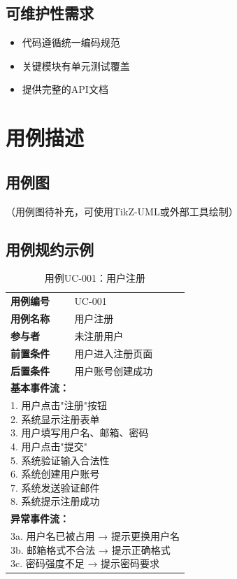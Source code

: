 \documentclass[12pt,a4paper]{ctexart}
\begin{document}
\subsection{可维护性需求}
\begin{itemize}
    \item 代码遵循统一编码规范
    \item 关键模块有单元测试覆盖
    \item 提供完整的API文档
\end{itemize}

\section{用例描述}
\subsection{用例图}
（用例图待补充，可使用TikZ-UML或外部工具绘制）

\subsection{用例规约示例}
\begin{table}[H]
\centering
\caption{用例UC-001：用户注册}
\begin{tabular}{lp{11cm}}
\toprule
\textbf{用例编号} & UC-001 \\
\textbf{用例名称} & 用户注册 \\
\textbf{参与者}   & 未注册用户 \\
\textbf{前置条件} & 用户进入注册页面 \\
\textbf{后置条件} & 用户账号创建成功 \\
\midrule
\multicolumn{2}{l}{\textbf{基本事件流：}} \\
\multicolumn{2}{l}{\parbox{11cm}{
1. 用户点击"注册"按钮 \\
2. 系统显示注册表单 \\
3. 用户填写用户名、邮箱、密码 \\
4. 用户点击"提交" \\
5. 系统验证输入合法性 \\
6. 系统创建用户账号 \\
7. 系统发送验证邮件 \\
8. 系统提示注册成功 \\
}} \\
\midrule
\multicolumn{2}{l}{\textbf{异常事件流：}} \\
\multicolumn{2}{l}{\parbox{11cm}{
3a. 用户名已被占用 → 提示更换用户名 \\
3b. 邮箱格式不合法 → 提示正确格式 \\
3c. 密码强度不足 → 提示密码要求 \\
}} \\
\bottomrule
\end{tabular}
\end{table}
\end{document}
